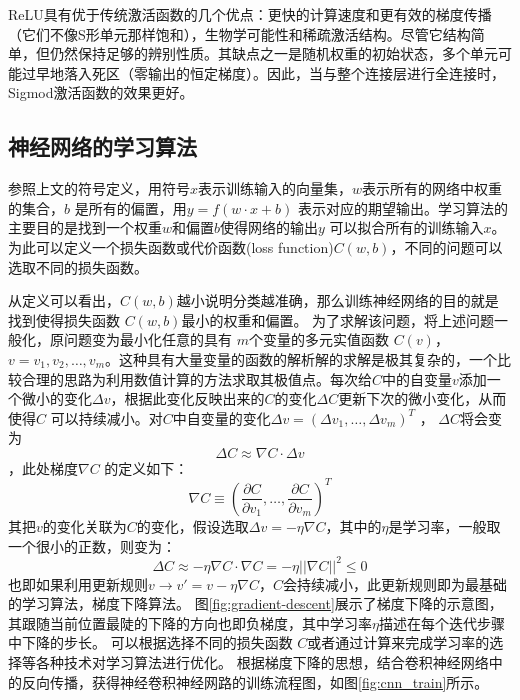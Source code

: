 ReLU具有优于传统激活函数的几个优点：更快的计算速度和更有效的梯度传播（它们不像S形单元那样饱和），生物学可能性和稀疏激活结构。尽管它结构简单，但仍然保持足够的辨别性质。其缺点之一是随机权重的初始状态，多个单元可能过早地落入死区（零输出的恒定梯度）。因此，当与整个连接层进行全连接时，Sigmod激活函数的效果更好。

\subsection{神经网络的学习算法}
参照上文的符号定义，用符号$x $表示训练输入的向量集，$w$表示所有的网络中权重的集合，$b$ 是所有的偏置，用$y=f(w\cdot x + b)$ 表示对应的期望输出。学习算法的主要目的是找到一个权重$w$和偏置$b$使得网络的输出$y$ 可以拟合所有的训练输入$x$。为此可以定义一个损失函数或代价函数(loss function)$C(w,b)$，不同的问题可以选取不同的损失函数。

从定义可以看出，$C(w,b) $越小说明分类越准确，那么训练神经网络的目的就是找到使得损失函数 $C(w,b)$最小的权重和偏置。
为了求解该问题，将上述问题一般化，原问题变为最小化任意的具有 $m $个变量的多元实值函数 $C(v) $， $v=v_1,v_2,\dots,v_m $。这种具有大量变量的函数的解析解的求解是极其复杂的，一个比较合理的思路为利用数值计算的方法求取其极值点。每次给$C $中的自变量$v$添加一个微小的变化$\Delta v $，根据此变化反映出来的$C $的变化$\Delta C $更新下次的微小变化，从而使得$C $ 可以持续减小。对$C $中自变量的变化$\Delta v=(\Delta v_1,\dots,\Delta v_m)^T $ ， $\Delta C $将会变为
\begin{equation}
    \Delta C \approx \nabla C \cdot \Delta v
    \label{equ:gradient1}
\end{equation}
，此处梯度$\nabla C $ 的定义如下：
\begin{equation}
\nabla C \equiv (\frac{\partial C}{\partial v_1},\dots,\frac{\partial C}{\partial v_m})^T
\end{equation}
其把$v$的变化关联为$C$的变化，假设选取$\Delta v=-\eta \nabla C $，其中的$\eta $是学习率，一般取一个很小的正数，则变为：
\begin{equation}
\Delta C \approx -\eta\nabla C\cdot\nabla C=-\eta||\nabla C||^2 \leq 0
\end{equation}
也即如果利用更新规则$v \rightarrow v'=v-\eta \nabla C$，$C$会持续减小，此更新规则即为最基础的学习算法，梯度下降算法。
图\ref{fig:gradient-descent}展示了梯度下降的示意图，其跟随当前位置最陡的下降的方向也即负梯度，其中学习率$ \eta $描述在每个迭代步骤中下降的步长。
可以根据选择不同的损失函数 $C $或者通过计算来完成学习率的选择等各种技术对学习算法进行优化。
根据梯度下降的思想，结合卷积神经网络中的反向传播，获得神经卷积神经网路的训练流程图，如图\ref{fig:cnn_train}所示。


